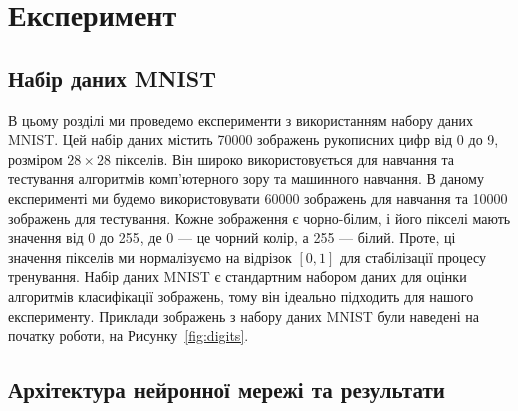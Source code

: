 \chapter{Експеримент}

\section{Набір даних MNIST}

В цьому розділі ми проведемо експерименти з використанням набору даних MNIST.
Цей набір даних містить 70000 зображень рукописних цифр від 0 до 9, розміром $28
\times 28$ пікселів. Він широко використовується для навчання та тестування
алгоритмів комп'ютерного зору та машинного навчання. В даному експерименті ми
будемо використовувати 60000 зображень для навчання та 10000 зображень для
тестування. Кожне зображення є чорно-білим, і його пікселі мають значення від 0
до 255, де 0 --- це чорний колір, а 255 --- білий. Проте, ці значення пікселів
ми нормалізуємо на відрізок $[0,1]$ для стабілізації процесу тренування. Набір
даних MNIST є стандартним набором даних для оцінки алгоритмів класифікації
зображень, тому він ідеально підходить для нашого експерименту. Приклади
зображень з набору даних MNIST були наведені на початку роботи, на
Рисунку~\ref{fig:digits}.

\section{Архітектура нейронної мережі та результати}


